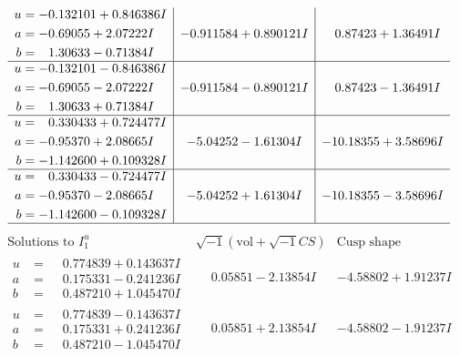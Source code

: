 \documentclass[1p]{elsarticle_modified}
\theoremstyle{definition}
\newcommand{\I}{\sqrt{-1}}
\begin{document}
$$\begin{array}{c|c|c}
\begin{aligned}
u &= -0.132101 + 0.846386 I \\
a &= -0.69055 + 2.07222 I \\
b &= \phantom{-}1.30633 - 0.71384 I\end{aligned}
 & -0.911584 + 0.890121 I & \phantom{-}0.87423 + 1.36491 I \\ \hline\begin{aligned}
u &= -0.132101 - 0.846386 I \\
a &= -0.69055 - 2.07222 I \\
b &= \phantom{-}1.30633 + 0.71384 I\end{aligned}
 & -0.911584 - 0.890121 I & \phantom{-}0.87423 - 1.36491 I \\ \hline\begin{aligned}
u &= \phantom{-}0.330433 + 0.724477 I \\
a &= -0.95370 + 2.08665 I \\
b &= -1.142600 + 0.109328 I\end{aligned}
 & -5.04252 - 1.61304 I & -10.18355 + 3.58696 I \\ \hline\begin{aligned}
u &= \phantom{-}0.330433 - 0.724477 I \\
a &= -0.95370 - 2.08665 I \\
b &= -1.142600 - 0.109328 I\end{aligned}
 & -5.04252 + 1.61304 I & -10.18355 - 3.58696 I\\
 \hline 
 \end{array}$$\newpage$$\begin{array}{c|c|c}  
\text{Solutions to }I^u_{1}& \I (\text{vol} + \sqrt{-1}CS) & \text{Cusp shape}\\
 \hline 
\begin{aligned}
u &= \phantom{-}0.774839 + 0.143637 I \\
a &= \phantom{-}0.175331 - 0.241236 I \\
b &= \phantom{-}0.487210 + 1.045470 I\end{aligned}
 & \phantom{-}0.05851 - 2.13854 I & -4.58802 + 1.91237 I \\ \hline\begin{aligned}
u &= \phantom{-}0.774839 - 0.143637 I \\
a &= \phantom{-}0.175331 + 0.241236 I \\
b &= \phantom{-}0.487210 - 1.045470 I\end{aligned}
 & \phantom{-}0.05851 + 2.13854 I & -4.58802 - 1.91237 I \\ \hline\begin{aligned}

\end{aligned}
\end{array}$$
\end{document}
